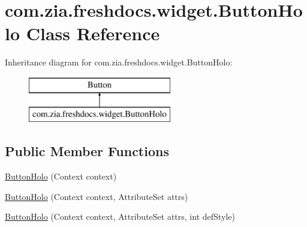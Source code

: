 \hypertarget{classcom_1_1zia_1_1freshdocs_1_1widget_1_1_button_holo}{\section{com.\-zia.\-freshdocs.\-widget.\-Button\-Holo Class Reference}
\label{classcom_1_1zia_1_1freshdocs_1_1widget_1_1_button_holo}
}
Inheritance diagram for com.\-zia.\-freshdocs.\-widget.\-Button\-Holo\-:\begin{figure}[H]
\begin{center}
\leavevmode
\includegraphics[height=2.000000cm]{classcom_1_1zia_1_1freshdocs_1_1widget_1_1_button_holo}
\end{center}
\end{figure}
\subsection*{Public Member Functions}
\begin{DoxyCompactItemize}
\item 
\hyperlink{classcom_1_1zia_1_1freshdocs_1_1widget_1_1_button_holo_ad56cad4a890c77926225e743a3a021d1}{Button\-Holo} (Context context)
\item 
\hyperlink{classcom_1_1zia_1_1freshdocs_1_1widget_1_1_button_holo_a2778cd56f74c4f3c5f6a7be139adcddf}{Button\-Holo} (Context context, Attribute\-Set attrs)
\item 
\hyperlink{classcom_1_1zia_1_1freshdocs_1_1widget_1_1_button_holo_af21b9c7d703185d41dacab0c9bba6dca}{Button\-Holo} (Context context, Attribute\-Set attrs, int def\-Style)
\end{DoxyCompactItemize}


